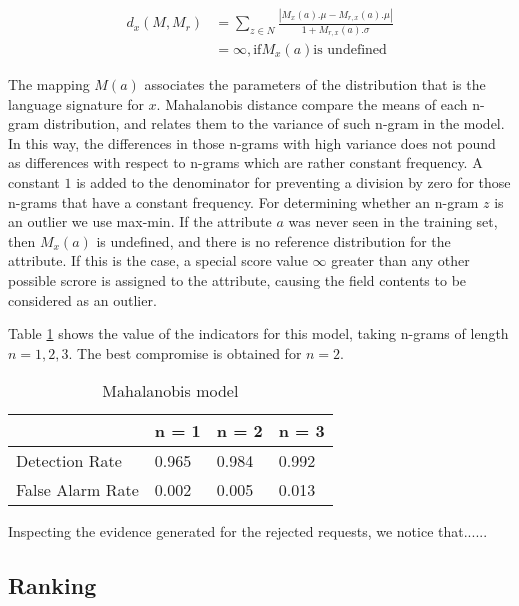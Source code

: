 \documentclass[runningheads,a4paper]{llncs}
\begin{document}
\begin{align*}
\label{MahalanobisDistance}
d_x(M,M_r) & = \sum_{z\in N} \frac{ | M_x(a).\mu - M_{r,x}(a).\mu |}{1+M_{r,x}(a).\sigma}\\
            & = \infty, \text{if} M_x(a) \text{is undefined} 
\end{align*}

The mapping $M(a)$ associates the parameters of the distribution that is the language signature for $x$. Mahalanobis distance compare the means of each n-gram distribution, and relates them to the variance of such n-gram in the model. In this way, the differences in those n-grams with high variance does not pound as differences with respect to n-grams which are rather constant frequency. A constant $1$ is added to the denominator for preventing a division by zero for those n-grams that have a constant frequency. For determining whether an n-gram $z$ is an outlier we use max-min. If the attribute $a$ was never seen in the training set, then $M_x(a)$ is undefined, and there is no reference distribution for the attribute. If this is the case, a special score value $\infty$ greater than any other possible scrore is assigned to the attribute, causing the field contents to be considered as an outlier.   

Table \ref{MahalanobisModelResults} shows the value of the indicators for this model, taking n-grams of length $n=1,2,3$. The best compromise is obtained for $n=2$.

\begin{table}[]
\centering
\caption{Mahalanobis model}
\label{MahalanobisModelResults}
\begin{tabular}{|l|l|l|l|}
\hline
                 & n = 1   & n = 2  & n = 3    \\
\hline
Detection Rate   &  0.965  & 0.984  & 0.992    \\
\hline
False Alarm Rate &  0.002  & 0.005  & 0.013    \\
\hline
\end{tabular}
\end{table}

Inspecting the evidence generated for the rejected requests, we notice that......

\subsection{Ranking}
\end{document}
